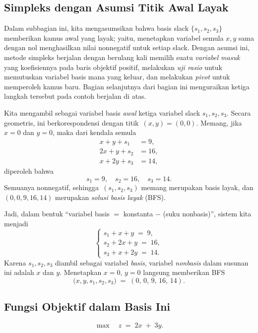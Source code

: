   

\subsection{Simpleks dengan Asumsi Titik Awal Layak}

Dalam subbagian ini, kita mengasumsikan bahwa basis slack \(\{s_1, s_2, s_3\}\) memberikan
kamus awal yang layak; yaitu, menetapkan variabel semula
\(x,y\) sama dengan nol menghasilkan nilai nonnegatif untuk setiap slack. Dengan
asumsi ini, metode simpleks berjalan dengan berulang kali memilih suatu
\emph{variabel masuk} yang koefisiennya pada baris objektif positif,
melakukan \emph{uji rasio} untuk memutuskan variabel basis mana yang keluar, dan
melakukan \emph{pivot} untuk memperoleh kamus baru. Bagian selanjutnya dari bagian ini
menguraikan ketiga langkah tersebut pada contoh berjalan di atas.

Kita mengambil sebagai variabel basis \emph{awal} ketiga variabel slack \(s_1, s_2, s_3\). Secara geometris, ini berkorespondensi dengan titik \(\,(x,y)=(0,0)\). Memang, jika \(x=0\) dan \(y=0\), maka dari kendala semula
\[
\begin{aligned}
  x + y + s_1 &= 9,\\
  2x + y + s_2 &= 16,\\
  x + 2y + s_3 &= 14,
\end{aligned}
\]
diperoleh bahwa
\[
s_1 = 9,
\quad
s_2 = 16,
\quad
s_3 = 14.
\]
Semuanya nonnegatif, sehingga \(\,(s_1,s_2,s_3)\) memang merupakan basis layak, dan \((0,0,9,16,14)\) merupakan \emph{solusi basis layak} (BFS).

Jadi, dalam bentuk ``variabel basis \(=\) konstanta \(-\) (suku nonbasis)'', sistem kita menjadi
\[
\begin{cases}
s_1 + x + y \;=\; 9,\\
s_2 + 2x + y \;=\; 16,\\
s_3 + x + 2y \;=\; 14.
\end{cases}
\]
Karena \(s_1, s_2, s_3\) diambil sebagai variabel \emph{basis}, variabel \emph{nonbasis} dalam susunan ini adalah \(x\) dan \(y\). Menetapkan \(x=0,\,y=0\) langsung memberikan BFS
\[
\bigl(x,y,s_1,s_2,s_3\bigr)
\;=\;
(0,\,0,\,9,\,16,\,14).
\]

\subsection*{Fungsi Objektif dalam Basis Ini}
%
\[
\max\quad z \;=\; 2x \;+\; 3y.
\]
%
%
%
